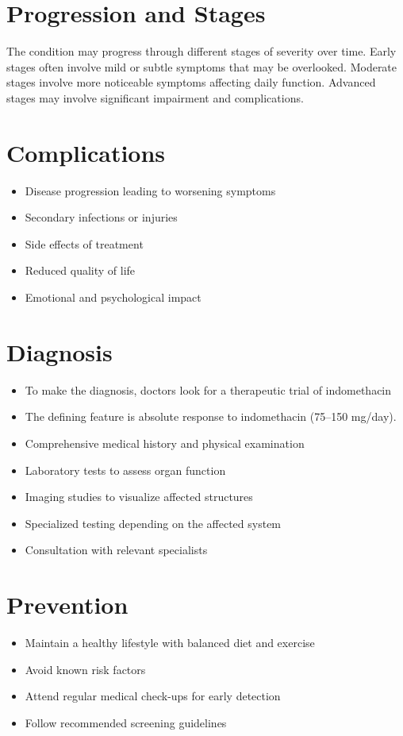 \section{Progression and Stages}
The condition may progress through different stages of severity over time. Early stages often involve mild or subtle symptoms that may be overlooked. Moderate stages involve more noticeable symptoms affecting daily function. Advanced stages may involve significant impairment and complications.
\section{Complications}
\begin{itemize}[noitemsep]
  \item Disease progression leading to worsening symptoms
  \item Secondary infections or injuries
  \item Side effects of treatment
  \item Reduced quality of life
  \item Emotional and psychological impact
\end{itemize}
\section{Diagnosis}
\begin{itemize}[noitemsep]
  \item To make the diagnosis, doctors look for a therapeutic trial of indomethacin
  \item The defining feature is absolute response to indomethacin (75--150 mg/day).
  \item Comprehensive medical history and physical examination
  \item Laboratory tests to assess organ function
  \item Imaging studies to visualize affected structures
  \item Specialized testing depending on the affected system
  \item Consultation with relevant specialists
\end{itemize}
\section{Prevention}
\begin{itemize}[noitemsep]
  \item Maintain a healthy lifestyle with balanced diet and exercise
  \item Avoid known risk factors
  \item Attend regular medical check-ups for early detection
  \item Follow recommended screening guidelines
\end{itemize}
